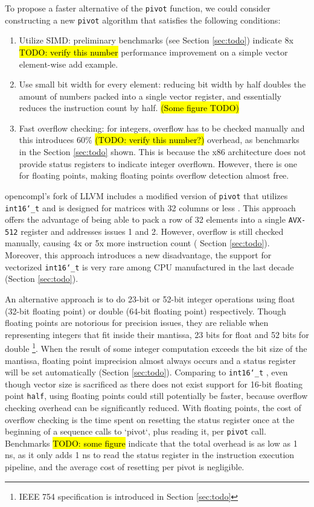 \documentclass[logo,bsc,singlespacing,parskip]{infthesis}
\newcommand{\dtshort}{\texttt{int16\char`_t} }
\begin{document}
To propose a faster alternative of the \texttt{pivot} function, we could
consider constructing a new \texttt{pivot} algorithm that satisfies the
following conditions:
\begin{enumerate}

\item Utilize SIMD: preliminary benchmarks (see Section \ref{sec:todo}) indicate
8x \hl{TODO: verify this number} performance improvement on a simple vector
element-wise add example. 

\item Use small bit width for every element: reducing bit width by half doubles the
amount of numbers packed into a single vector register, and essentially reduces
the instruction count by half.  \hl{(Some figure TODO)}

\item Fast overflow checking: for integers, overflow has to be checked manually
and this introduces 60\%  \hl{(TODO: verify this number?)} overhead, as
benchmarks in the Section \ref{sec:todo} shown. This is because the x86
architecture does not provide status registers to indicate integer overflown.
However, there is one for floating points, making floating points overflow
detection almost free. 

\end{enumerate}


opencompl’s fork of LLVM includes a modified version of \texttt{pivot} that
utilizes \dtshort and is designed for matrices with 32 columns or less \cite{FPL2}.
This approach offers the advantage of being able to pack a row of 32 elements
into a single \texttt{AVX-512} register and addresses issues 1 and 2. However,
overflow is still checked manually, causing 4x or 5x more instruction count (
Section \ref{sec:todo}). Moreover, this approach introduces a new disadvantage,
the support for vectorized \dtshort is very rare among CPU manufactured
in the last decade (Section \ref{sec:todo}). 

An alternative approach is to do 23-bit or 52-bit integer operations using float
(32-bit floating point) or double (64-bit floating point) respectively. Though
floating points are notorious for precision issues, they are reliable when
representing integers that fit inside their mantissa, 23 bits for float and 52
bits for double \footnote{ IEEE 754 specification is introduced in Section
\ref{sec:todo}}. When the result of some integer computation exceeds the bit
size of the mantissa, floating point imprecision almost always occurs and a
status register will be set automatically (Section \ref{sec:todo}). Comparing to
\dtshort, even though vector size is sacrificed as there does not exist
support for 16-bit floating point \texttt{half}, using floating points could
still potentially be faster, because overflow checking overhead can be
significantly reduced. With floating points, the cost of overflow checking is
the time spent on resetting the status register once at the beginning of a
sequence calls to `pivot`, plus reading it, per \texttt{pivot} call. Benchmarks
\hl{TODO: some figure} indicate that the total overhead is as low as 1 ns, as it
only adds 1 ns to read the status register in the instruction execution
pipeline, and the average cost of resetting per pivot is negligible. 
\end{document}

